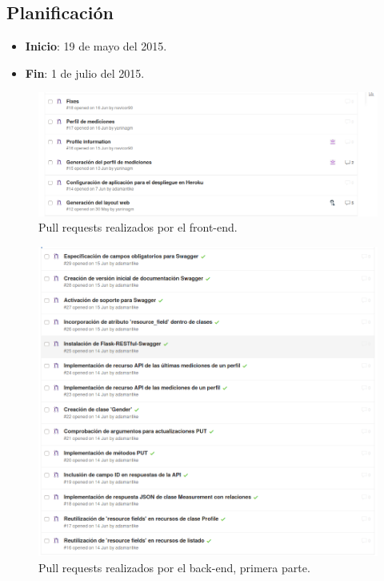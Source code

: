 \subsection{Planificación}
\begin{itemize}
    \item \textbf{Inicio}: 19 de mayo del 2015.
    \item \textbf{Fin}: 1 de julio del 2015.
\end{itemize}

\begin{figure}[h]
  \centering
  \includegraphics[width=.8\textwidth]{img/2-PR}
  \caption{Pull requests realizados por el front-end.}
  \label{2-PR}
\end{figure}
\begin{figure}[h]
  \centering
  \includegraphics[width=.8\textwidth]{img/2-PR_back2}
  \caption{Pull requests realizados por el back-end, primera parte.}
  \label{2-PR_back2}
\end{figure}
